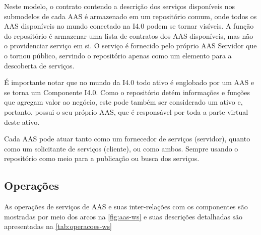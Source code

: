 Neste modelo, o contrato contendo a descrição dos serviços disponíveis nos submodelos de cada AAS é armazenado em um repositório comum, onde todos os AAS disponíveis no mundo conectado na I4.0 podem se tornar visíveis. A função do repositório é armazenar uma lista de contratos dos AAS disponíveis, mas não o providenciar serviço em si. O serviço é fornecido pelo próprio AAS Servidor que o tornou público, servindo o repositório apenas como um elemento para a descoberta de serviços.

É importante notar que no mundo da I4.0 todo ativo é englobado por um AAS e se torna um Componente I4.0. Como o repositório detém informações e funções que agregam valor ao negócio, este pode também ser considerado um ativo e, portanto, possui o seu próprio AAS, que é responsável por toda a parte virtual deste ativo.

Cada AAS pode atuar tanto como um fornecedor de serviços (servidor), quanto como um solicitante de serviços (cliente), ou como ambos. Sempre usando o repositório como meio para a publicação ou busca dos serviços.

\subsection{Operações}

As operações de serviços de AAS e suas inter-relações com os componentes são mostradas por meio dos arcos na \autoref{fig:aas-ws} e suas descrições detalhadas são apresentadas na \autoref{tab:operacoes-ws}

